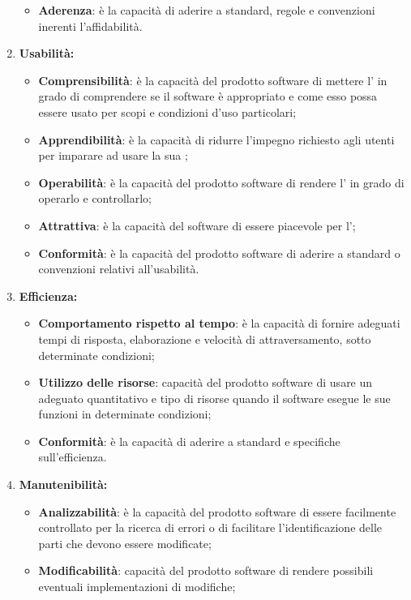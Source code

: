 \begin{enumerate}
\begin{itemize}
      \item \textbf{Aderenza}: è la capacità di aderire a standard, regole e convenzioni inerenti l'affidabilità.
    \end{itemize}
    \item \textbf{Usabilità:}
    \begin{itemize}
      \item \textbf{Comprensibilità}: è la capacità del prodotto software di mettere l' in grado di comprendere se il software è appropriato e come esso possa essere usato per scopi e condizioni d'uso particolari;
      \item \textbf{Apprendibilità}: è la capacità di ridurre l'impegno richiesto agli utenti per imparare ad usare la sua ;
      \item \textbf{Operabilità}: è la capacità del prodotto software di rendere l' in grado di operarlo e controllarlo;
      \item \textbf{Attrattiva}: è la capacità del software di essere piacevole per l';
      \item \textbf{Conformità}: è la capacità del prodotto software di aderire a standard o convenzioni relativi all'usabilità.
    \end{itemize}
    \item \textbf{Efficienza:}
    \begin{itemize}
      \item \textbf{Comportamento rispetto al tempo}: è la capacità di fornire adeguati tempi di risposta, elaborazione e velocità di attraversamento, sotto determinate condizioni;
      \item \textbf{Utilizzo delle risorse}: capacità del prodotto software di usare un adeguato quantitativo e tipo di risorse quando il software esegue le sue funzioni in determinate condizioni;
      \item \textbf{Conformità}: è la capacità di aderire a standard e specifiche sull'efficienza.
    \end{itemize}
    \item \textbf{Manutenibilità:}
    \begin{itemize}
      \item \textbf{Analizzabilità}: è la capacità del prodotto software di essere facilmente controllato per la ricerca di errori o di facilitare l'identificazione delle parti che devono essere modificate;
      \item \textbf{Modificabilità}: capacità del prodotto software di rendere possibili eventuali implementazioni di modifiche;

\end{itemize}
\end{enumerate}
